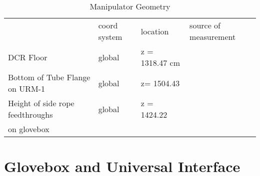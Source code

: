   
\begin{table}
\begin{center}
\begin{tabular}{|l|l|l|l|} \hline
                               & coord system & location & source of measurement \\
DCR Floor                      & global &  z = 1318.47 cm &  \\
\hline
Bottom of Tube Flange on URM-1 & global & z= 1504.43 & \\
\hline
Height of side rope feedthroughs & global & z = 1424.22 & \\
on glovebox                      & & & \\
\hline
\end{tabular}
\caption[Manipulator Geometry]
        {Manipulator Geometry
         }
\end{center}
\end{table}
  
  
\section{Glovebox and Universal Interface}
  
